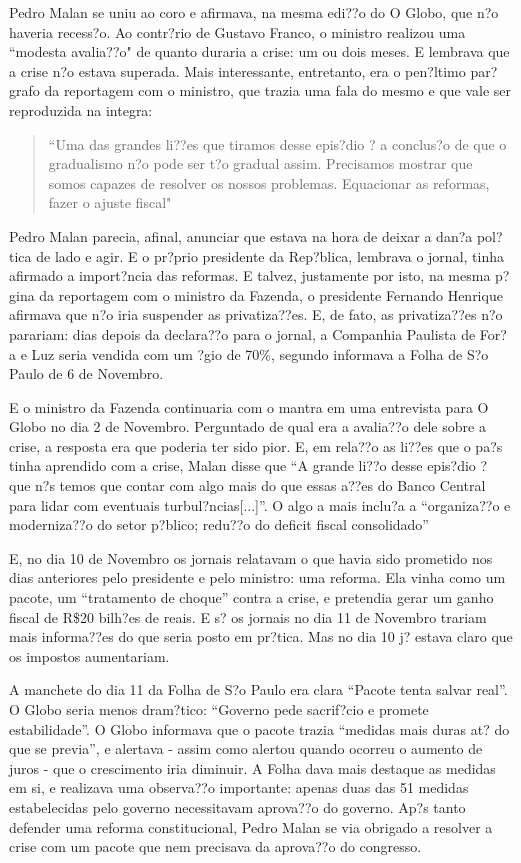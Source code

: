 \documentclass{article}
\begin{document}
Pedro Malan se uniu ao coro e afirmava, na mesma edi??o do O Globo, que n?o haveria recess?o. Ao contr?rio de Gustavo Franco, o ministro realizou uma ``modesta avalia??o" de quanto duraria a crise: um ou dois meses. E lembrava que a crise n?o estava superada. Mais interessante, entretanto, era o pen?ltimo par?grafo da reportagem com o ministro, que trazia uma fala do mesmo e que vale ser reproduzida na integra:

\begin{quote}
``Uma das grandes li??es que tiramos desse epis?dio ? a conclus?o de que o gradualismo n?o pode ser t?o gradual assim. Precisamos mostrar que somos capazes de resolver os nossos problemas. Equacionar as reformas, fazer o ajuste fiscal"
\end{quote}

Pedro Malan parecia, afinal, anunciar que estava na hora de deixar a dan?a pol?tica de lado e agir. E o pr?prio presidente da Rep?blica, lembrava o jornal, tinha afirmado a import?ncia das reformas. E talvez, justamente por isto, na mesma p?gina da reportagem com o ministro da Fazenda, o presidente Fernando Henrique afirmava que n?o iria suspender as privatiza??es. E, de fato, as privatiza??es n?o parariam:  dias depois da declara??o para o jornal, a Companhia Paulista de For?a e Luz seria vendida com um ?gio de 70\%, segundo informava a Folha de S?o Paulo de 6 de Novembro.

E o ministro da Fazenda continuaria com o mantra em uma entrevista para O Globo no dia 2 de Novembro. Perguntado de qual era a avalia??o dele sobre a crise, a resposta era que poderia ter sido pior. E, em rela??o as li??es que o pa?s tinha aprendido com a crise, Malan disse que ``A grande li??o desse epis?dio ? que n?s temos que contar com algo mais do que essas a??es do Banco Central para lidar com eventuais turbul?ncias[...]''. O algo a mais inclu?a a ``organiza??o e moderniza??o do setor p?blico; redu??o do deficit fiscal consolidado'' 

E, no dia 10 de Novembro os jornais relatavam o que havia sido prometido nos dias anteriores pelo presidente e pelo ministro: uma reforma. Ela vinha como um pacote, um ``tratamento de choque'' contra a crise, e pretendia gerar um ganho fiscal de R\$20 bilh?es de reais. E s? os jornais no dia 11 de Novembro trariam mais informa??es do que seria posto em pr?tica. Mas no dia 10 j? estava claro que os impostos aumentariam.

A manchete do dia 11 da Folha de S?o Paulo era clara ``Pacote tenta salvar real''. O Globo seria menos dram?tico: ``Governo pede sacrif?cio e promete estabilidade''. O Globo informava que o pacote trazia ``medidas mais duras at? do que se previa'', e alertava - assim como alertou quando ocorreu o aumento de juros - que o crescimento iria diminuir. A Folha dava mais destaque as medidas em si, e realizava uma observa??o importante: apenas duas das 51 medidas estabelecidas pelo governo necessitavam aprova??o do governo. Ap?s tanto defender uma reforma constitucional, Pedro Malan se via obrigado a resolver a crise com um pacote que nem precisava da aprova??o do congresso.
\end{document}
